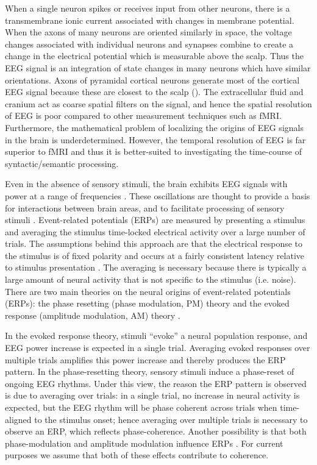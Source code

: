 When a single neuron spikes or receives input from other neurons, there is a transmembrane ionic current associated with changes in membrane potential. When the axons of many neurons are oriented similarly in space, the voltage changes associated with individual neurons and synapses combine to create a change in the electrical potential which is measurable above the scalp. Thus the EEG signal is an integration of state changes in many neurons which have similar orientations. Axons of pyramidal cortical neurons generate most of the cortical EEG signal because these are closest to the scalp (\citealt{FedermeierLaszlo2009,KutasDale1997}). The extracellular fluid and cranium act as coarse spatial filters on the signal, and hence the spatial resolution of EEG is poor compared to other measurement techniques such as fMRI. Furthermore, the mathematical problem of localizing the origins of EEG signals in the brain is underdetermined. However, the temporal resolution of EEG is far superior to fMRI and thus it is better-suited to investigating the time-course of syntactic/semantic processing. 

Even in the absence of sensory stimuli, the brain exhibits EEG signals with power at a range of frequencies \citep{Buzsaki2006}. These oscillations are thought to provide a basis for interactions between brain areas, and to facilitate processing of sensory stimuli \citep{FriesEtAl2001,GrayEtAl1989}. Event-related potentials (ERPs) are measured by presenting a stimulus and averaging the stimulus time-locked electrical activity over a large number of trials. The assumptions behind this approach are that the electrical response to the stimulus is of fixed polarity and occurs at a fairly consistent latency relative to stimulus presentation \citep{PennyEtAl2002}. The averaging is necessary because there is typically a large amount of neural activity that is not specific to the stimulus (i.e. noise). There are two main theories on the neural origins of event-related potentials (ERPs): the phase resetting (phase modulation, PM) theory and the evoked response (amplitude modulation, AM) theory \citep{MakeigEtAl2002,PennyEtAl2002,ShahEtAl2004}.

In the evoked response theory, stimuli “evoke” a neural population response, and EEG power increase is expected in a single trial. Averaging evoked responses over multiple trials amplifies this power increase and thereby produces the ERP pattern. In the phase-resetting theory, sensory stimuli induce a phase-reset of ongoing EEG rhythms. Under this view, the reason the ERP pattern is observed is due to averaging over trials: in a single trial, no increase in neural activity is expected, but the EEG rhythm will be phase coherent across trials when time-aligned to the stimulus onset; hence averaging over multiple trials is necessary to observe an ERP, which reflects phase-coherence. Another possibility is that both phase-modulation and amplitude modulation influence ERPs \citep{PennyEtAl2002,ShahEtAl2004}. For current purposes we assume that both of these effects contribute to coherence. 

